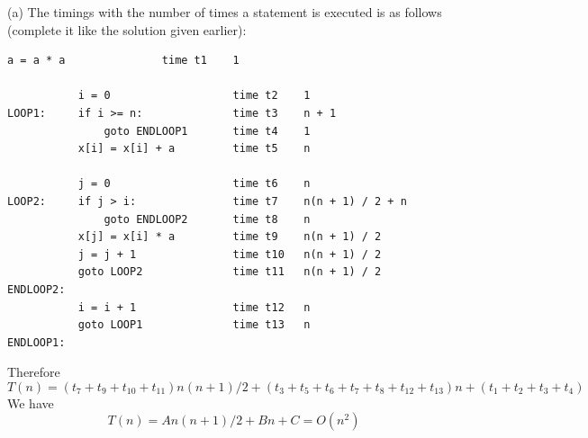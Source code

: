 

(a) 
The timings with the number of times a statement is executed
is as follows (complete it like the solution given earlier):
\begin{Verbatim}[frame=single,commandchars]
           a = a * a               time t1    1

           i = 0                   time t2    1
LOOP1:     if i >= n:              time t3    n + 1
               goto ENDLOOP1       time t4    1
           x[i] = x[i] + a         time t5    n

           j = 0                   time t6    n
LOOP2:     if j > i:               time t7    n(n + 1) / 2 + n
               goto ENDLOOP2       time t8    n
           x[j] = x[i] * a         time t9    n(n + 1) / 2
           j = j + 1               time t10   n(n + 1) / 2
           goto LOOP2              time t11   n(n + 1) / 2
ENDLOOP2:
           i = i + 1               time t12   n
           goto LOOP1              time t13   n
ENDLOOP1:
\end{Verbatim}
Therefore
\[
T(n) = (t_7 + t_9 + t_{10} + t_{11})n(n + 1)/2 + (t_3 + t_5 + t_6 + t_7 + t_8 + t_{12} + t_{13})n + (t_1 + t_2 + t_3 + t_4)
\]
We have
\[
T(n) = An(n+1)/2 + Bn + C = O(n^2)
\]
